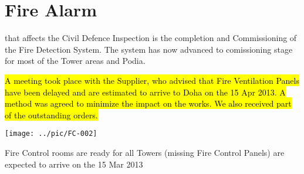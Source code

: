\chapter {Fire Alarm}
\label{firealarm}
 that affects the Civil Defence Inspection is the completion and Commissioning of the Fire Detection System. The system has now advanced to comissioning stage for most of the Tower areas and Podia.

\hl{A meeting took place with the Supplier, who advised that Fire Ventilation Panels have been delayed and  are estimated to arrive to Doha on the 15 Apr 2013. A method was agreed to minimize the impact on the works. We also received part of the outstanding orders.}

\begin{marginfigure}
\texttt{[image: ../pic/FC-002]}
\caption{Fire Control rooms are ready for all Towers (missing Fire Control Panels) are expected to arrive on the 15 Mar 2013}
\end{marginfigure}



